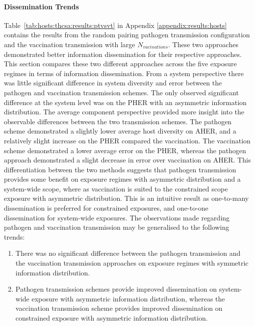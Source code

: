 %
%
\paragraph{Dissemination Trends}
Table~\ref{tab:hosts:thcsa:results:ptvsvt} in Appendix \ref{appendix:results:hosts} contains the results from the random pairing pathogen transmission configuration and the vaccination transmission with large $N_{vacinations}$. These two approaches demonstrated better information dissemination for their respective approaches. This section compares these two different approaches across the five exposure regimes in terms of information dissemination.
From a system perspective there was little significant difference in system diversity and error between the pathogen and vaccination transmission schemes. The only observed significant difference at the system level was on the PHER with an asymmetric information distribution.
The average component perspective provided more insight into the observable differences between the two transmission schemes. The pathogen scheme demonstrated a slightly lower average host diversity on AHER, and a relatively slight increase on the PHER compared the vaccination. The vaccination scheme demonstrated a lower average error on the PHER, whereas the pathogen approach demonstrated a slight decrease in error over vaccination on AHER. This differentiation between the two methods suggests that pathogen transmission provides some benefit on exposure regimes with asymmetric distribution and a system-wide scope, where as vaccination is suited to the constrained scope exposure with asymmetric distribution. This is an intuitive result as one-to-many dissemination is preferred for constrained exposures, and one-to-one dissemination for system-wide exposures. 
The observations made regarding pathogen and vaccination transmission may be generalised to the following trends:

\begin{enumerate}
	\item There was no significant difference between the pathogen transmission and the vaccination transmission approaches on exposure regimes with symmetric information distribution.
	\item Pathogen transmission schemes provide improved dissemination on system-wide exposure with asymmetric information distribution, whereas the vaccination transmission scheme provides improved dissemination on constrained exposure with asymmetric information distribution.
\end{enumerate}

